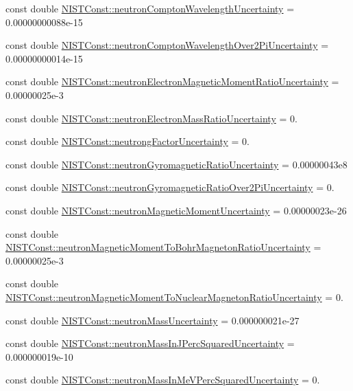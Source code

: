 \begin{DoxyCompactItemize}
\item 
const double \hyperlink{group___neutron_ga5fbfb355a266a045aa4e26e2c6150ff1}{N\+I\+S\+T\+Const\+::neutron\+Compton\+Wavelength\+Uncertainty} = 0.\+00000000088e-\/15
\item 
const double \hyperlink{group___neutron_ga439ee482618c8fa6a6db4fe16b0a7f4f}{N\+I\+S\+T\+Const\+::neutron\+Compton\+Wavelength\+Over2\+Pi\+Uncertainty} = 0.\+00000000014e-\/15
\item 
const double \hyperlink{group___neutron_gacb0476e237024ae73115cb69cf2ec595}{N\+I\+S\+T\+Const\+::neutron\+Electron\+Magnetic\+Moment\+Ratio\+Uncertainty} = 0.\+00000025e-\/3
\item 
const double \hyperlink{group___neutron_gae3a33d004a2b899af7fbf115d5f66a1b}{N\+I\+S\+T\+Const\+::neutron\+Electron\+Mass\+Ratio\+Uncertainty} = 0.
\item 
const double \hyperlink{group___neutron_ga3420096045700dd4b700203f09b40838}{N\+I\+S\+T\+Const\+::neutrong\+Factor\+Uncertainty} = 0.
\item 
const double \hyperlink{group___neutron_ga4f48bb36482cdd64b95e17e52939df96}{N\+I\+S\+T\+Const\+::neutron\+Gyromagnetic\+Ratio\+Uncertainty} = 0.\+00000043e8
\item 
const double \hyperlink{group___neutron_ga428e1a7239cc03c9e202ac1acbb39d42}{N\+I\+S\+T\+Const\+::neutron\+Gyromagnetic\+Ratio\+Over2\+Pi\+Uncertainty} = 0.
\item 
const double \hyperlink{group___neutron_gac34c63a7cdf2e8b0a98c38835dafe19d}{N\+I\+S\+T\+Const\+::neutron\+Magnetic\+Moment\+Uncertainty} = 0.\+00000023e-\/26
\item 
const double \hyperlink{group___neutron_ga036634170600c84498e80133e11f1228}{N\+I\+S\+T\+Const\+::neutron\+Magnetic\+Moment\+To\+Bohr\+Magneton\+Ratio\+Uncertainty} = 0.\+00000025e-\/3
\item 
const double \hyperlink{group___neutron_ga027ad989f7bdaeb277518dd928470e4e}{N\+I\+S\+T\+Const\+::neutron\+Magnetic\+Moment\+To\+Nuclear\+Magneton\+Ratio\+Uncertainty} = 0.
\item 
const double \hyperlink{group___neutron_gacce8fdd0e4017cd74864a675cd18ca82}{N\+I\+S\+T\+Const\+::neutron\+Mass\+Uncertainty} = 0.\+000000021e-\/27
\item 
const double \hyperlink{group___neutron_ga57aaa28bbca122689e5a0541663225c7}{N\+I\+S\+T\+Const\+::neutron\+Mass\+In\+J\+Perc\+Squared\+Uncertainty} = 0.\+000000019e-\/10
\item 
const double \hyperlink{group___neutron_gabad9960163d1a927a926784d170822e1}{N\+I\+S\+T\+Const\+::neutron\+Mass\+In\+Me\+V\+Perc\+Squared\+Uncertainty} = 0.

\end{DoxyCompactItemize}
